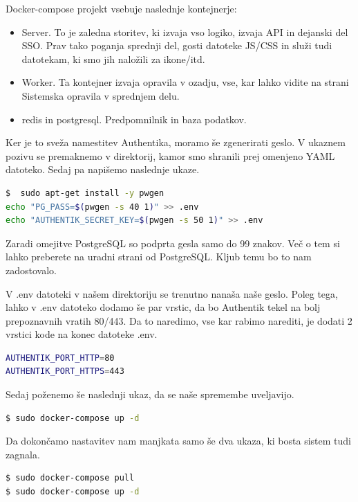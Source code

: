 \documentclass[a4paper,12pt,openright]{book}
\begin{document}
Docker-compose projekt vsebuje naslednje kontejnerje:

\begin{itemize}
    \item Server. To je zaledna storitev, ki izvaja vso logiko, izvaja API in dejanski del SSO. Prav tako poganja sprednji del, gosti datoteke JS/CSS in služi tudi datotekam, ki smo jih naložili za ikone/itd.
    \item Worker. Ta kontejner izvaja opravila v ozadju, vse, kar lahko vidite na strani Sistemska opravila v sprednjem delu.
    \item redis in postgresql. Predpomnilnik in baza podatkov.
\end{itemize}

Ker je to sveža namestitev Authentika, moramo še zgenerirati geslo. V ukaznem pozivu se premaknemo v direktorij, kamor smo shranili prej omenjeno YAML datoteko. Sedaj pa napišemo naslednje ukaze.

\begin{lstlisting}[language=bash]
$  sudo apt-get install -y pwgen
echo "PG_PASS=$(pwgen -s 40 1)" >> .env
echo "AUTHENTIK_SECRET_KEY=$(pwgen -s 50 1)" >> .env
\end{lstlisting}

Zaradi omejitve PostgreSQL so podprta gesla samo do 99 znakov. Več o tem si lahko preberete na uradni strani od PostgreSQL\cite{PostgreSQL}. Kljub temu bo to nam zadostovalo. \newline

V .env datoteki v našem direktoriju se trenutno nanaša naše geslo. Poleg tega, lahko v .env datoteko dodamo še par vrstic, da bo Authentik tekel na bolj prepoznavnih vratih 80/443. Da to naredimo, vse kar rabimo narediti, je dodati 2 vrstici kode na konec datoteke .env.

\begin{lstlisting}[language=bash]
AUTHENTIK_PORT_HTTP=80
AUTHENTIK_PORT_HTTPS=443
\end{lstlisting}

Sedaj poženemo še naslednji ukaz, da se naše spremembe uveljavijo. 

\begin{lstlisting}[language=bash]
$ sudo docker-compose up -d
\end{lstlisting}

Da dokončamo nastavitev nam manjkata samo še dva ukaza, ki bosta sistem tudi zagnala.

\begin{lstlisting}[language=bash]
$ sudo docker-compose pull
$ sudo docker-compose up -d
\end{lstlisting}
\end{document}
